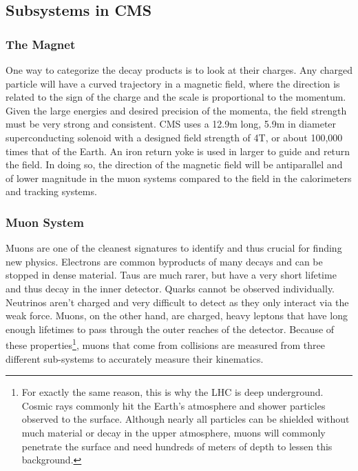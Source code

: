 \subsection{Subsystems in CMS}
\label{sec:CMSSubsystem}

\subsubsection{The Magnet}
\label{sec:Magnet}

One way to categorize the decay products is to look at their charges. Any charged particle will have a curved trajectory in a magnetic field, where the direction is related to the sign of the charge and the scale is proportional to the momentum. Given the large energies and desired precision of the momenta, the field strength must be very strong and consistent. CMS uses a 12.9m long, 5.9m in diameter superconducting solenoid with a designed field strength of 4T, or about 100,000 times that of the Earth. An iron return yoke is used in larger to guide and return the field. In doing so, the direction of the magnetic field will be antiparallel and of lower magnitude in the muon systems compared to the field in the calorimeters and tracking systems.

\subsubsection{Muon System}
\label{sec:MuonSystem}

Muons are one of the cleanest signatures to identify and thus crucial for finding new physics. Electrons are common byproducts of many decays and can be stopped in dense material. Taus are much rarer, but have a very short lifetime and thus decay in the inner detector. Quarks cannot be observed individually. Neutrinos aren't charged and very difficult to detect as they only interact via the weak force. Muons, on the other hand, are charged, heavy leptons that have long enough lifetimes to pass through the outer reaches of the detector. Because of these properties\footnote{For exactly the same reason, this is why the LHC is deep underground. Cosmic rays commonly hit the Earth's atmosphere and shower particles observed to the surface. Although nearly all particles can be shielded without much material or decay in the upper atmosphere, muons will commonly penetrate the surface and need hundreds of meters of depth to lessen this background.}, muons that come from collisions are measured from three different sub-systems to accurately measure their kinematics. 

